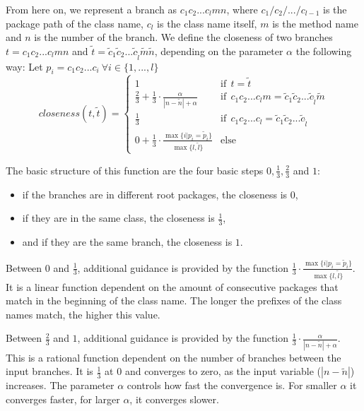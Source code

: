 \documentclass[
  a4paper,  %
  twoside,  %
  bibliography=totoc,
  headsepline,
  cleardoublepage=empty,
  parskip=half,
  draft=false
]{scrbook}
\begin{document}
From here on, we represent a branch as $c_1 c_2 ... c_l m n$, where $c_1/c_2/.../c_{l-1}$ is the package path of the class name, $c_l$ is the class name itself, $m$ is the method name and $n$ is the number of the branch.
We define the closeness of two branches $t = c_1 c_2 ... c_l m n$ and $\tilde{t} = \tilde{c}_1 \tilde{c}_2 ... \tilde{c}_{\tilde{l}} \tilde{m} \tilde{n}$, depending on the parameter $\alpha$ the following way:
Let $p_i = c_1 c_2 ... c_i\ \forall i \in \{1, ..., l\}$
\begin{equation}\label{eq:codeBasedFitness}
closeness(t, \tilde{t}) = \left \{
\begin{array}{ll}
	1 & \text{if}\ \ t = \tilde{t}\\
	\frac{2}{3} + \frac{1}{3} \cdot \frac{\alpha}{|n - \tilde{n}| + \alpha} & \text{if}\ \ c_1 c_2 ... c_l m = \tilde{c}_1 \tilde{c}_2 ... \tilde{c}_{\tilde{l}} \tilde{m}\\
	\frac{1}{3} & \text{if}\ \ c_1 c_2 ... c_l = \tilde{c}_1 \tilde{c}_2 ... \tilde{c}_{\tilde{l}}\\
	0 + \frac{1}{3} \cdot \frac{\max \{i | p_i = \tilde{p}_i\}}{\max \{l, \tilde{l}\}} & \text{else}
\end{array}
\right.
\end{equation}

The basic structure of this function are the four basic steps $0, \frac{1}{3}, \frac{2}{3}$ and $1$:
\begin{itemize}
	\item if the branches are in different root packages, the closeness is $0$, 
	\item if they are in the same class, the closeness is $\frac{1}{3}$,
	\item and if they are the same branch, the closeness is $1$.
\end{itemize}

Between $0$ and $\frac{1}{3}$, additional guidance is provided by the function $\frac{1}{3} \cdot \frac{\max \{i | p_i = \tilde{p}_i\}}{\max \{l, \tilde{l}\}}$. It is a linear function dependent on the amount of consecutive packages that match in the beginning of the class name. The longer the prefixes of the class names match, the higher this value.

Between $\frac{2}{3}$ and $1$, additional guidance is provided by the function $\frac{1}{3} \cdot \frac{\alpha}{|n - \tilde{n}| + \alpha}$. This is a rational function dependent on the number of branches between the input branches. It is $\frac{1}{3}$ at $0$ and converges to zero, as the input variable ($|n - \tilde{n}|$) increases. The parameter $\alpha$ controls how fast the convergence is. For smaller $\alpha$ it converges faster, for larger $\alpha$, it converges slower.
\end{document}
